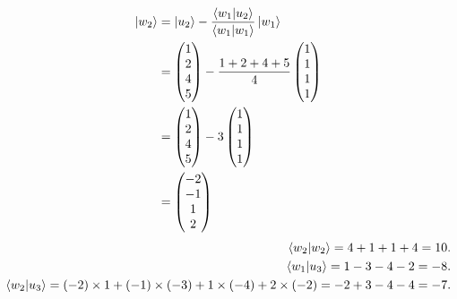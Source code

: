 \documentclass[10pt]{article}
\begin{document}
\begin{align*}
\ket{w_2} &= \ket{u_2} - \frac{\braket{ w_1 | u_2 }}{ \braket{ w_1 | w_1 } } \ket{w_1} \\
               &= \begin{pmatrix}
               1 \\
               2 \\
               4 \\
               5
               \end{pmatrix} - \frac{1 + 2 + 4 + 5}{4} \begin{pmatrix}
               1 \\
               1 \\
               1 \\
               1
               \end{pmatrix} \\
               &= \begin{pmatrix}
               1 \\
               2 \\
               4 \\
               5
               \end{pmatrix} - 3 \begin{pmatrix}
               1 \\
               1 \\
               1 \\
               1
               \end{pmatrix} \\
               &= \begin{pmatrix}
               -2 \\
               -1 \\
               1 \\
               2
               \end{pmatrix}
\end{align*}
\begin{align*}
\braket{ w_2 | w_2 } = 4 + 1 + 1 + 4 = 10. \\
\braket{ w_1 | u_3 } = 1 - 3 - 4 - 2 = -8. \\
\braket{ w_2 | u_3 } = (-2) \times 1 + (-1) \times (-3) + 1 \times (-4) + 2 \times (-2) = -2 + 3 -4 - 4 = -7. 
\end{align*}
\end{document}
